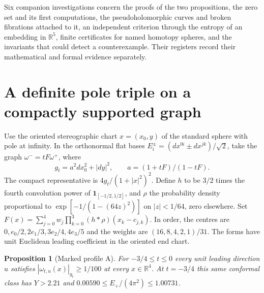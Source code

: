 \documentclass[11pt,letterpaper]{article}
\numberwithin{equation}{section}
\newtheorem{proposition}[theorem]{Proposition}
\begin{document}
Six companion investigations concern the proofs of
the two propositions, the zero set and its first computations, the
pseudoholomorphic curves and broken fibrations attached to it, an
independent criterion through the entropy of an embedding in
\(\mathbb R^5\), finite certificates for named homotopy spheres, and
the invariants that could detect a counterexample. Their registers
record their mathematical and formal evidence separately.

\section{A definite pole triple on a compactly supported graph}

Use the oriented stereographic chart $x=(x_0,y)$ of the standard sphere
with pole at infinity. In the orthonormal flat bases
$E_i^\pm=(dx^{0i}\pm dx^{jk})/\sqrt2$, take the graph
$\omega^-=tF\omega^+$, where
\[
 g_t=a^2dx_0^2+|dy|^2,\qquad a=(1+tF)/(1-tF).
\]
The compact representative is $4g_t/(1+|x|^2)^2$.
Define $h$ to be $3/2$ times the fourth convolution power of
$\mathbf1_{[-1/2,1/2]}$, and $\rho$ the probability density
proportional to $\exp[-1/(1-(64z)^2)]$ on $|z|<1/64$, zero elsewhere.
Set $F(x)=\sum_{j=0}^4 w_j\prod_{k=0}^3(h*\rho)(x_k-c_{j,k})$.
In order, the centres are $0,e_0/2,2e_1/3,3e_2/4,4e_3/5$ and the
weights are $(16,8,4,2,1)/31$. The forms have unit Euclidean leading
coefficient in the oriented end chart.

\begin{proposition}[Marked profile A]\label{prop:marked-profile}
For $-3/4\le t\le0$ every unit leading direction $u$ satisfies
$|\omega_{t,u}(x)|_{g_t}\ge1/100$ at every $x\in\mathbb R^4$.
At $t=-3/4$ this same conformal class has $Y>2.21$ and
$0.00590\le E_+/(4\pi^2)\le1.00731$.
\end{proposition}
\end{document}
